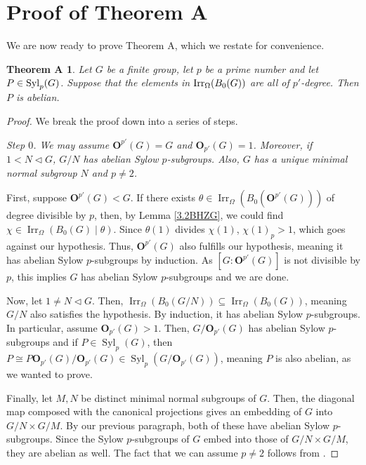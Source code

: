 \documentclass[12pt]{amsart}
\theoremstyle{theorem}
\newtheorem*{thmA}{Theorem A}
\theoremstyle{definition}
\newcommand{\bO}{{\mathbf O}}
\newcommand{\Irr}{{\operatorname{Irr}}}
\newcommand{\Syl}{{\operatorname{Syl}}}
\begin{document}
	\section{Proof of Theorem A}
	We are now ready to prove Theorem A, which we restate for convenience.
	
	\begin{thmA}
		Let $G$ be a finite group, let $p$ be a prime number and let $P\in{\rm Syl}_p(G)$. Suppose that the elements in ${\rm Irr}_{\Omega}(B_0(G))$ are all of $p'$-degree. Then $P$ is abelian.
	\end{thmA}
	
	\begin{proof}
		We break the proof down into a series of steps.
		
		\bigskip
		
		\textit{Step $0$. We may assume $\bO^{p'}(G)=G$ and $\bO_{p'}(G)=1$. Moreover,
			if $1<N\lhd G$, $G/N$ has abelian Sylow $p$-subgroups. Also, $G$ has a unique minimal normal subgroup $N$ and $p\neq 2$.}
		\medskip
		
		First, suppose $\bO^{p'}(G) < G$. If there exists $\theta \in \Irr_{\Omega}(B_0(\bO^{p'}(G)))$ of degree divisible by $p$, then, by Lemma \ref{3.2BHZG}, we could find $\chi \in \Irr_{\Omega}(B_0(G)\mid\theta)$. Since $\theta(1)$ divides $\chi(1)$, $\chi(1)_p > 1$, which goes against our hypothesis. Thus, $\bO^{p'}(G)$ also fulfills our hypothesis, meaning it has abelian Sylow $p$-subgroups by induction. As $[G:\bO^{p'}(G)]$ is not divisible by $p$, this implies $G$ has abelian Sylow $p$-subgroups and we are done.
		
		Now, let $1 \neq N \lhd G$. Then, $\Irr_{\Omega}(B_0(G/N)) \subseteq \Irr_{\Omega}(B_0(G))$, meaning $G/N$ also satisfies the hypothesis. By induction, it has abelian Sylow $p$-subgroups. In particular, assume $\bO_{p'}(G) > 1$. Then, $G/\bO_{p'}(G)$ has abelian Sylow $p$-subgroups and if $P \in \Syl_p(G)$, then $P \cong P\bO_{p'}(G)/\bO_{p'}(G) \in \Syl_p(G/\bO_{p'}(G))$, meaning $P$ is also abelian, as we wanted to prove.
		
		Finally, let $M, N$ be distinct minimal normal subgroups of $G$. Then, the diagonal map composed with the canonical projections gives an embedding of $G$ into $G/N \times G/M$. By our previous paragraph, both of these have abelian Sylow $p$-subgroups. Since the Sylow $p$-subgroups of $G$ embed into those of $G/N \times G/M$, they are abelian as well. The fact that we can assume $p \neq 2$ follows from \cite[Theorem 2]{MMRSF}.
		

\end{proof}
\end{document}
